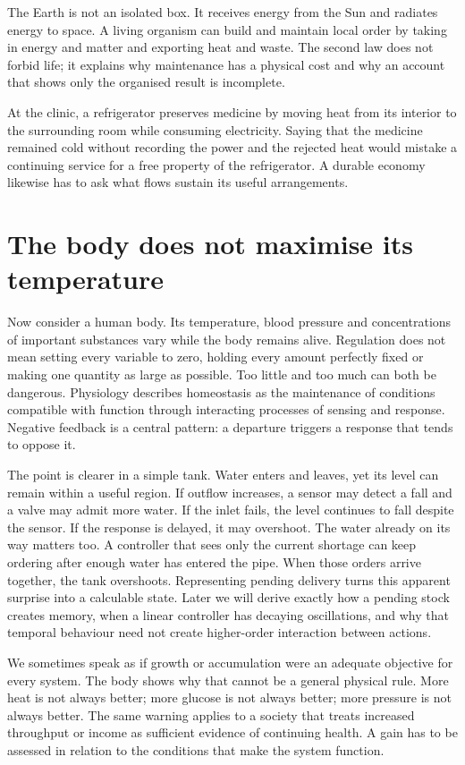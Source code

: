 The Earth is not an isolated box. It receives energy from the Sun and radiates energy to space. A living organism can build and maintain local order by taking in energy and matter and exporting heat and waste. The second law does not forbid life; it explains why maintenance has a physical cost and why an account that shows only the organised result is incomplete.

At the clinic, a refrigerator preserves medicine by moving heat from its interior to the surrounding room while consuming electricity. Saying that the medicine remained cold without recording the power and the rejected heat would mistake a continuing service for a free property of the refrigerator. A durable economy likewise has to ask what flows sustain its useful arrangements.

\section{The body does not maximise its temperature}
Now consider a human body. Its temperature, blood pressure and concentrations of important substances vary while the body remains alive. Regulation does not mean setting every variable to zero, holding every amount perfectly fixed or making one quantity as large as possible. Too little and too much can both be dangerous. Physiology describes homeostasis as the maintenance of conditions compatible with function through interacting processes of sensing and response. Negative feedback is a central pattern: a departure triggers a response that tends to oppose it.\cite{intro-homeostasis,intro-physiology}

The point is clearer in a simple tank. Water enters and leaves, yet its level can remain within a useful region. If outflow increases, a sensor may detect a fall and a valve may admit more water. If the inlet fails, the level continues to fall despite the sensor. If the response is delayed, it may overshoot. The water already on its way matters too. A controller that sees only the current shortage can keep ordering after enough water has entered the pipe. When those orders arrive together, the tank overshoots. Representing pending delivery turns this apparent surprise into a calculable state. Later we will derive exactly how a pending stock creates memory, when a linear controller has decaying oscillations, and why that temporal behaviour need not create higher-order interaction between actions.

We sometimes speak as if growth or accumulation were an adequate objective for every system. The body shows why that cannot be a general physical rule. More heat is not always better; more glucose is not always better; more pressure is not always better. The same warning applies to a society that treats increased throughput or income as sufficient evidence of continuing health. A gain has to be assessed in relation to the conditions that make the system function.

